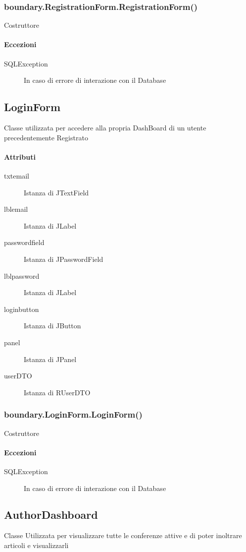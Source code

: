 \subsubsection{boundary.RegistrationForm.RegistrationForm()}
Costruttore
\paragraph{Eccezioni}
\begin{description}
\item[SQLException] In caso di errore di interazione con il Database
\end{description}

\subsection{LoginForm}
Classe utilizzata per accedere alla propria DashBoard di un utente precedentemente Registrato
\paragraph{Attributi}
\begin{description}
\item[txtemail] Istanza di JTextField
\item[lblemail] Istanza di JLabel
\item[passwordfield] Istanza di JPasswordField
\item[lblpassword] Istanza di JLabel
\item[loginbutton] Istanza di JButton
\item[panel] Istanza di JPanel
\item[userDTO] Istanza di RUserDTO
\end{description}

\subsubsection{boundary.LoginForm.LoginForm()}
Costruttore
\paragraph{Eccezioni}
\begin{description}
\item[SQLException] In caso di errore di interazione con il Database
\end{description}

\subsection{AuthorDashboard}
Classe Utilizzata per visualizzare tutte le conferenze attive e di poter inoltrare articoli e visualizzarli 
